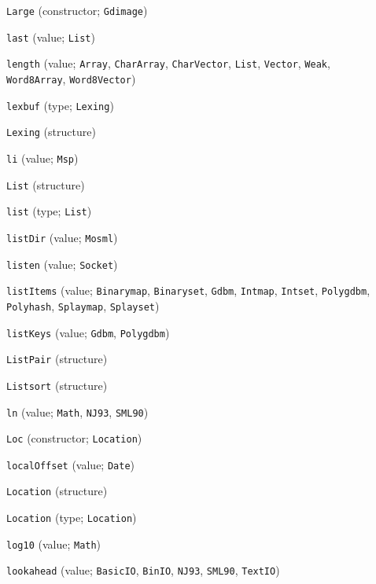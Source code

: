 \begin{description}
\item[] \verb"Large" (constructor; \verb"Gdimage")
\item[] \verb"last" (value; \verb"List")
\item[] \verb"length" (value; \verb"Array", \verb"CharArray", \verb"CharVector", \verb"List", \verb"Vector", \verb"Weak", \verb"Word8Array", \verb"Word8Vector")
\item[] \verb"lexbuf" (type; \verb"Lexing")
\item[] \verb"Lexing" (structure)
\item[] \verb"li" (value; \verb"Msp")
\item[] \verb"List" (structure)
\item[] \verb"list" (type; \verb"List")
\item[] \verb"listDir" (value; \verb"Mosml")
\item[] \verb"listen" (value; \verb"Socket")
\item[] \verb"listItems" (value; \verb"Binarymap", \verb"Binaryset", \verb"Gdbm", \verb"Intmap", \verb"Intset", \verb"Polygdbm", \verb"Polyhash", \verb"Splaymap", \verb"Splayset")
\item[] \verb"listKeys" (value; \verb"Gdbm", \verb"Polygdbm")
\item[] \verb"ListPair" (structure)
\item[] \verb"Listsort" (structure)
\item[] \verb"ln" (value; \verb"Math", \verb"NJ93", \verb"SML90")
\item[] \verb"Loc" (constructor; \verb"Location")
\item[] \verb"localOffset" (value; \verb"Date")
\item[] \verb"Location" (structure)
\item[] \verb"Location" (type; \verb"Location")
\item[] \verb"log10" (value; \verb"Math")
\item[] \verb"lookahead" (value; \verb"BasicIO", \verb"BinIO", \verb"NJ93", \verb"SML90", \verb"TextIO")
\\[2ex]


\end{description}
